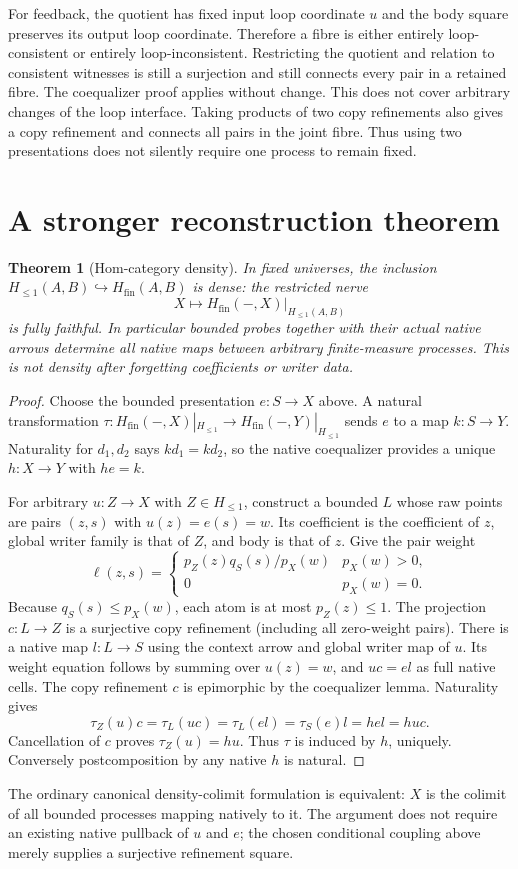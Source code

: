 \documentclass[11pt]{article}
\newtheorem{theorem}{Theorem}
\newcommand{\Ha}{H_{\leq 1}}
\newcommand{\HM}{H_{\mathrm{fin}}}
\newcommand{\Hh}{\HM}
\newcommand{\Bb}{\Ha}
\begin{document}
For feedback, the quotient has fixed input loop coordinate $u$ and the body
square preserves its output loop coordinate. Therefore a fibre is either
entirely loop-consistent or entirely loop-inconsistent. Restricting the
quotient and relation to consistent witnesses is still a surjection and
still connects every pair in a retained fibre. The coequalizer proof applies
without change. This does not cover arbitrary changes of the loop interface.
Taking products of two copy refinements also gives a copy refinement and
connects all pairs in the joint fibre. Thus using two presentations does not
silently require one process to remain fixed.

\section{A stronger reconstruction theorem}
\begin{theorem}[Hom-category density]
In fixed universes, the inclusion $\Bb(A,B)\hookrightarrow\Hh(A,B)$ is
dense: the restricted nerve
\[
 X\longmapsto\Hh(-,X)|_{\Bb(A,B)}
\]
is fully faithful. In particular bounded probes together with their actual
native arrows determine all native maps between arbitrary finite-measure
processes. This is not density after forgetting coefficients or writer data.
\end{theorem}
\begin{proof}
Choose the bounded presentation $e:S\to X$ above. A natural transformation
$\tau:\Hh(-,X)|_{\Bb}\to\Hh(-,Y)|_{\Bb}$ sends $e$ to a map $k:S\to Y$.
Naturality for $d_1,d_2$ says $kd_1=kd_2$, so the native coequalizer provides
a unique $h:X\to Y$ with $he=k$.

For arbitrary $u:Z\to X$ with $Z\in\Bb$, construct a bounded $L$ whose raw
points are pairs $(z,s)$ with $u(z)=e(s)=w$. Its coefficient is the coefficient
of $z$, global writer family is that of $Z$, and body is that of $z$.
Give the pair weight
\[
 \ell(z,s)=\begin{cases}p_Z(z)q_S(s)/p_X(w)&p_X(w)>0,\\0&p_X(w)=0.\end{cases}
\]
Because $q_S(s)\leq p_X(w)$, each atom is at most $p_Z(z)\leq1$.
The projection $c:L\to Z$ is a surjective copy refinement (including all
zero-weight pairs). There is a native map $l:L\to S$ using the context
arrow and global writer map of $u$. Its weight equation follows by summing
over $u(z)=w$, and $uc=el$ as full native cells. The copy refinement $c$ is
epimorphic by the coequalizer lemma. Naturality gives
\[
 \tau_Z(u)c=\tau_L(uc)=\tau_L(el)=\tau_S(e)l=hel=huc.
\]
Cancellation of $c$ proves $\tau_Z(u)=hu$. Thus $\tau$ is induced by $h$,
uniquely. Conversely postcomposition by any native $h$ is natural.
\end{proof}
The ordinary canonical density-colimit formulation is equivalent: $X$ is
the colimit of all bounded processes mapping natively to it. The argument
does not require an existing native pullback of $u$ and $e$; the chosen
conditional coupling above merely supplies a surjective refinement square.
\end{document}
